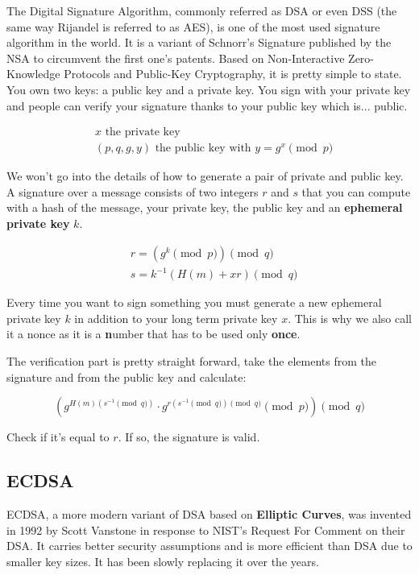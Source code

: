 \documentclass[a4paper,11pt]{article}
\begin{document}
The Digital Signature Algorithm, commonly referred as DSA or even DSS (the same way Rijandel is referred to as AES), is one of the most used signature algorithm in the world. It is a variant of Schnorr's Signature\cite{schnorr} published by the NSA to circumvent the first one's patents. Based on Non-Interactive Zero-Knowledge Protocols and Public-Key Cryptography, it is pretty simple to state. You own two keys: a public key and a private key. You sign with your private key and people can verify your signature thanks to your public key which is... public.

\begin{align*}
&x \text{ the private key} \\
&(p, q, g, y) \text{ the public key with } y = g^x \pmod{p}
\end{align*}

We won't go into the details of how to generate a pair of private and public key. A signature over a message consists of two integers $r$ and $s$ that you can compute with a hash of the message, your private key, the public key and an \textbf{ephemeral private key} $k$.

\begin{align*}
&r = (g^k \pmod{p}) \pmod{q}\\
&s = k^{-1} ( H(m) + x r ) \pmod{q}
\end{align*}

Every time you want to sign something you must generate a new ephemeral private key $k$ in addition to your long term private key $x$. This is why we also call it a nonce as it is a \textbf{n}umber that has to be used only \textbf{once}.

The verification part is pretty straight forward, take the elements from the signature and from the public key and calculate:

$$ (g^{H(m) (s^{-1} \pmod{q})} \cdot g^{r (s^{-1} \pmod{q}) \pmod{q}} \pmod{p}) \pmod{q} $$

Check if it's equal to $r$. If so, the signature is valid.

\subsection{ECDSA}\label{ecdsa}

ECDSA, a more modern variant of DSA based on \textbf{Elliptic Curves}, was invented in 1992 by Scott Vanstone in response to NIST's Request For Comment on their DSA\cite{ecdsa}. It carries better security assumptions and is more efficient than DSA due to smaller key sizes. It has been slowly replacing it over the years.
\end{document}
